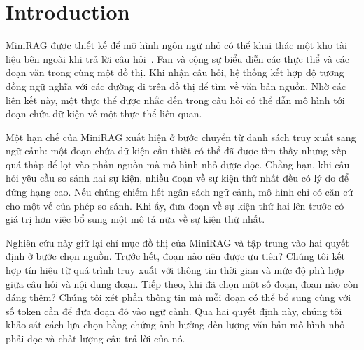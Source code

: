 
\begin{abstract}
Khi nhiều đoạn văn cùng đề cập đến một sự kiện, đoạn phù hợp nhất với câu hỏi chưa chắc là đoạn đáng thêm nhất vào ngữ cảnh. Giá trị của đoạn tiếp theo còn phụ thuộc vào những dữ kiện mà mô hình đã được cung cấp. Chúng tôi khảo sát hai quyết định này trong MiniRAG: xếp hạng các đoạn theo mức độ liên quan và chọn các đoạn bổ sung cho nhau trong giới hạn ngữ cảnh của mô hình ngôn ngữ nhỏ. Chúng tôi đánh giá Qwen2.5-3B-Instruct trên hai nguồn có đặc điểm khác nhau: hội thoại cá nhân trong LiHua-World và tin tức trong MultiHop-RAG. Trên LiHua-World, độ chính xác trung bình cao nhất khi từng đoạn được chấm cùng câu hỏi bằng cross-encoder. Trên MultiHop-RAG, mức tăng độ chính xác lớn nhất xuất hiện khi mở rộng tập ứng viên và xếp hạng lại các đoạn. Bước chọn đoạn theo lượng thông tin dự kiến bổ sung trên mỗi token giúp rút ngắn ngữ cảnh trên MultiHop-RAG, trong khi mức thay đổi độ chính xác so với cross-encoder nhỏ trên cả hai bộ dữ liệu. Kết quả cho thấy bước xếp hạng đem lại phần lớn mức tăng độ chính xác quan sát được, còn lợi ích rõ nhất của bước chọn tập là giảm lượng văn bản mô hình phải đọc trên MultiHop-RAG.
\end{abstract}

\section{Introduction}
MiniRAG được thiết kế để mô hình ngôn ngữ nhỏ có thể khai thác một kho tài liệu bên ngoài khi trả lời câu hỏi~\cite{fan2025minirag}. Fan và cộng sự biểu diễn các thực thể và các đoạn văn trong cùng một đồ thị. Khi nhận câu hỏi, hệ thống kết hợp độ tương đồng ngữ nghĩa với các đường đi trên đồ thị để tìm về văn bản nguồn. Nhờ các liên kết này, một thực thể được nhắc đến trong câu hỏi có thể dẫn mô hình tới đoạn chứa dữ kiện về một thực thể liên quan.

Một hạn chế của MiniRAG xuất hiện ở bước chuyển từ danh sách truy xuất sang ngữ cảnh: một đoạn chứa dữ kiện cần thiết có thể đã được tìm thấy nhưng xếp quá thấp để lọt vào phần nguồn mà mô hình nhỏ được đọc. Chẳng hạn, khi câu hỏi yêu cầu so sánh hai sự kiện, nhiều đoạn về sự kiện thứ nhất đều có lý do để đứng hạng cao. Nếu chúng chiếm hết ngân sách ngữ cảnh, mô hình chỉ có căn cứ cho một vế của phép so sánh. Khi ấy, đưa đoạn về sự kiện thứ hai lên trước có giá trị hơn việc bổ sung một mô tả nữa về sự kiện thứ nhất.

Nghiên cứu này giữ lại chỉ mục đồ thị của MiniRAG và tập trung vào hai quyết định ở bước chọn nguồn. Trước hết, đoạn nào nên được ưu tiên? Chúng tôi kết hợp tín hiệu từ quá trình truy xuất với thông tin thời gian và mức độ phù hợp giữa câu hỏi và nội dung đoạn. Tiếp theo, khi đã chọn một số đoạn, đoạn nào còn đáng thêm? Chúng tôi xét phần thông tin mà mỗi đoạn có thể bổ sung cùng với số token cần để đưa đoạn đó vào ngữ cảnh. Qua hai quyết định này, chúng tôi khảo sát cách lựa chọn bằng chứng ảnh hưởng đến lượng văn bản mô hình nhỏ phải đọc và chất lượng câu trả lời của nó.

